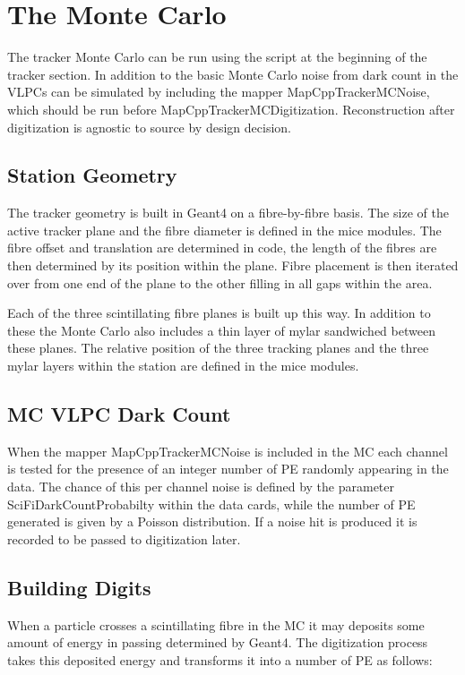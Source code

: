 \section{The Monte Carlo}
\label{Sect:SciFiMonteCarlo}

The tracker Monte Carlo can be run using the script at the beginning of the tracker section.  In addition to the basic Monte Carlo noise from dark count in the VLPCs can be simulated by including the mapper MapCppTrackerMCNoise, which should be run before MapCppTrackerMCDigitization.  Reconstruction after digitization is agnostic to source by design decision.

\subsection{Station Geometry}
The tracker geometry is built in Geant4 on a fibre-by-fibre basis.  The size of the active tracker plane and the fibre diameter is defined in the mice modules.  The fibre offset and translation are determined in code, the length of the fibres are then determined by its position within the plane.  Fibre placement is then iterated over from one end of the plane to the other filling in all gaps within the area.

Each of the three scintillating fibre planes is built up this way.  In addition to these the Monte Carlo also includes a thin layer of mylar sandwiched between these planes.  The relative position of the three tracking planes and the three mylar layers within the station are defined in the mice modules.

\subsection{MC VLPC Dark Count}
When the mapper MapCppTrackerMCNoise is included in the MC each channel is tested for the presence of an integer number of PE randomly appearing in the data.  The chance of this per channel noise is defined by the parameter SciFiDarkCountProbabilty within the data cards, while the number of PE generated is given by a Poisson distribution.  If a noise hit is produced it is recorded to be passed to digitization later. 

\subsection{Building Digits}
When a particle crosses a scintillating fibre in the MC it may deposits some amount of energy in passing determined by Geant4.  The digitization process takes this deposited energy and transforms it into a number of PE as follows: 

